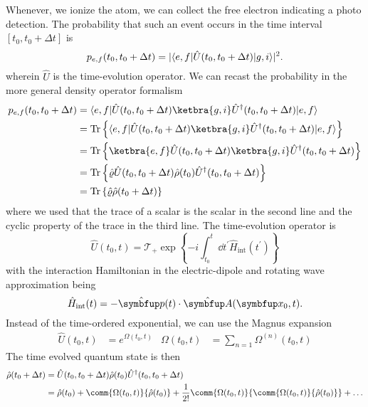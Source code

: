 Whenever, we ionize the atom, we can collect the free electron indicating a photo detection.
The probability that such an event occurs in the time interval $[t_0,t_0+\Delta t]$ is
\begin{equation}
	p_{e,f}(t_0,t_0+\Delta t)
	=
	\lvert
		\langle e,f\rvert
		\hat{U}(t_0,t_0+\Delta t)
		\lvert g,i\rangle
	\rvert^2
	.
\end{equation}
wherein $\hat{U}$ is the time-evolution operator.
We can recast the probability in the more general density operator formalism
\begin{equation}
	\begin{split}
		p_{e,f}(t_0,t_0+\Delta t)
		&=
		\bra{e,f}
		\hat{U}(t_0,t_0+\Delta t)
		\ketbra{g,i}
		\hat{U}^\dagger(t_0,t_0+\Delta t)
		\ket{e,f}
		\\
		&=
		\trace\left\{
			\bra{e,f}
			\hat{U}(t_0,t_0+\Delta t)
			\ketbra{g,i}
			\hat{U}^\dagger(t_0,t_0+\Delta t)
			\ket{e,f}
		\right\}
		\\
		&=
		\trace\left\{
			\ketbra{e,f}
			\hat{U}(t_0,t_0+\Delta t)
			\ketbra{g,i}
			\hat{U}^\dagger(t_0,t_0+\Delta t)
		\right\}
		\\
		&=
		\trace\left\{
			\hat\varrho
			\hat{U}(t_0,t_0+\Delta t)
			\hat\rho(t_0)
			\hat{U}^\dagger(t_0,t_0+\Delta t)
		\right\}
		\\
		&=
		\trace\left\{
			\hat\varrho
			\hat\rho(t_0+\Delta t)
		\right\}
	\end{split}
\end{equation}
where we used that the trace of a scalar is the scalar in the second line and the cyclic property of the trace in the third line.
The time-evolution operator is
\begin{equation}
	\hat{U}(t_0,t)
	=
	\mathcal{T}_+
	\exp\left\{
		-i
		\int_{t_0}^t\dd{t^\prime}
		\hat{H}_\text{int}(t^\prime)
	\right\}
\end{equation}
with the interaction Hamiltonian in the electric-dipole and rotating wave approximation being
\begin{equation}
	\hat{H}_\text{int}(t)
	=
	-
	\hat{\vb{p}}(t)
	\vdot
	\hat{\vb{A}}(\vb{x}_0,t)
	.
\end{equation}
Instead of the time-ordered exponential, we can use the Magnus expansion
\begin{align}
	\hat{U}(t_0,t)
	&=
	e^{\Omega(t_0,t)}
	&
	\Omega(t_0,t)
	&=
	\sum_{n=1}\Omega^{(n)}(t_0,t)
\end{align}
The time evolved quantum state is then
\begin{equation}
	\begin{split}
		\hat\rho(t_0+\Delta t)
		&=
		\hat{U}(t_0,t_0+\Delta t)
		\hat\rho(t_0)
		\hat{U}^\dagger(t_0,t_0+\Delta t)
		\\
		&=
		\hat\rho(t_0)
		+
		\comm{\Omega(t_0,t)}{\hat\rho(t_0)}
		+
		\frac{1}{2!}
		\comm{\Omega(t_0,t)}{\comm{\Omega(t_0,t)}{\hat\rho(t_0)}}
		+
		\dots
	\end{split}
\end{equation}
